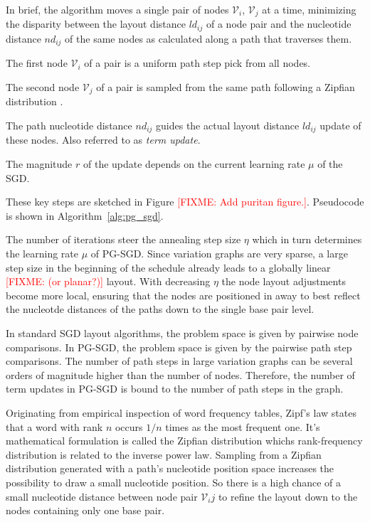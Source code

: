 \documentclass{bioinfo}
\theoremstyle{definition}
\newcommand{\red}[1]{{\textcolor{Red}{#1}}}
\newcommand{\FIXME}[1]{\red{[FIXME: #1]}}
\begin{document}
	In brief, the algorithm moves a single pair of nodes $\mathcal{V}_i$, $\mathcal{V}_j$ at a time, minimizing the disparity between the layout distance $ld_{ij}$ of a node pair and the nucleotide distance $nd_{ij}$ of the same nodes as calculated along a path that traverses them.
	\begin{enumerate*}[label=(\roman*)]
		\item The first node $\mathcal{V}_i$ of a pair is a uniform path step pick from all nodes.
		\item The second node $\mathcal{V}_j$ of a pair is sampled from the same path following a Zipfian distribution \citep{Zipf1932}.
		\item The path nucleotide distance  $nd_{ij}$ guides the actual layout distance $ld_{ij}$ update of these nodes. Also referred to as \textit{term update}.
		\item The magnitude $r$ of the update depends on the current learning rate $\mu$ of the SGD.
	\end{enumerate*}
	These key steps are sketched in Figure \FIXME{Add puritan figure.}. Pseudocode is shown in Algorithm~\ref{alg:pg_sgd}.
	
	
	
	The number of iterations steer the annealing step size $\eta$ which in turn determines the learning rate $\mu$ of PG-SGD. 
	Since variation graphs are very sparse, a large step size in the beginning of the schedule already leads to a globally linear \FIXME{(or planar?)} layout.
	With decreasing $\eta$ the node layout adjustments become more local, ensuring that the nodes are positioned in away to best reflect the nucleotde distances of the paths down to the single base pair level. 
	
	In standard SGD layout algorithms, the problem space is given by pairwise node comparisons. In PG-SGD, the problem space is given by the pairwise path step comparisons. The number of path steps in large variation graphs can be several orders of magnitude higher than the number of nodes. Therefore, the number of term updates in PG-SGD is bound to the number of path steps in the graph.

	Originating from empirical inspection of word frequency tables, Zipf's law states that a word with rank $n$ occurs $1/n$ times as the most frequent one.
	It's mathematical formulation is called the Zipfian distribution whichs rank-frequency distribution is related to the inverse power law.
	Sampling from a Zipfian distribution generated with a path's nucleotide position space increases the possibility to draw a small nucleotide position.
	So there is a high chance of a small nucleotide distance between node pair $\mathcal{V}_ij$ to refine the layout down to the nodes containing only one base pair.
	
\end{document}
